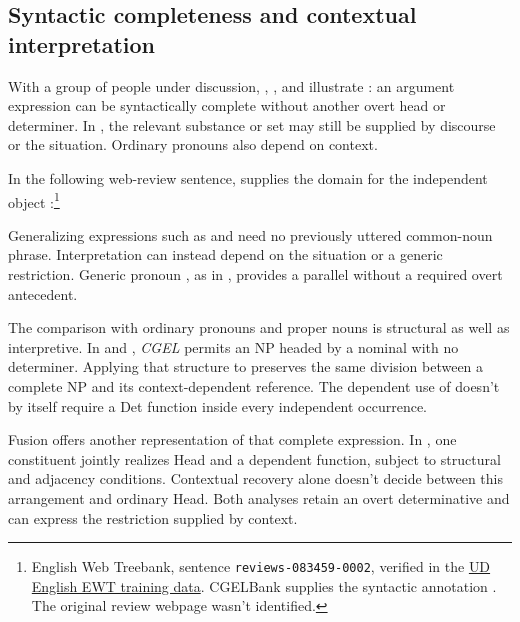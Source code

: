\documentclass[12pt]{article}
\begin{document}
\subsection{Syntactic completeness and contextual interpretation}\label{sec:saturation}

With a group of people under discussion, , , and  illustrate : an argument expression can be syntactically complete without another overt head or determiner. In , the relevant substance or set may still be supplied by discourse or the situation. Ordinary pronouns also depend on context.

In the following web-review sentence,  supplies the domain for the independent object :\footnote{English Web Treebank, sentence \nolinkurl{reviews-083459-0002}, verified in the \href{https://github.com/UniversalDependencies/UD_English-EWT/blob/master/en_ewt-ud-train.conllu}{UD English EWT training data}. CGELBank supplies the syntactic annotation \citep{reynolds2023unified}. The original review webpage wasn't identified.}

\ea\label{ex:attested-both}
\z

Generalizing expressions such as  and  need no previously uttered common-noun phrase. Interpretation can instead depend on the situation or a generic restriction. Generic pronoun , as in , provides a parallel without a required overt antecedent.

The comparison with ordinary pronouns and proper nouns is structural as well as interpretive. In  and , \textit{CGEL} permits an NP headed by a nominal with no determiner. Applying that structure to  preserves the same division between a complete NP and its context-dependent reference. The dependent use of  doesn't by itself require a Det function inside every independent occurrence.

Fusion offers another representation of that complete expression. In \textcite{Payne2007}, one constituent jointly realizes Head and a dependent function, subject to structural and adjacency conditions. Contextual recovery alone doesn't decide between this arrangement and ordinary Head. Both analyses retain an overt determinative and can express the restriction supplied by context.
\end{document}

